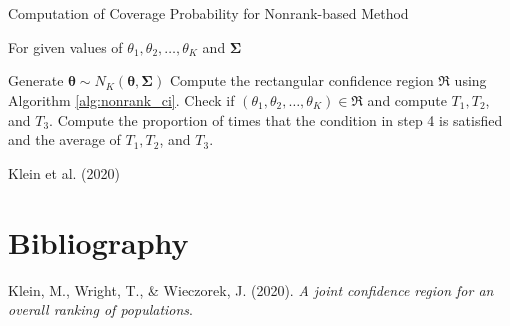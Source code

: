 \documentclass[
  12pt,
  a4paper,
]{article}
\newlength{\cslhangindent}
\newenvironment{CSLReferences}[2] %
 {\begin{list}{}{%
  \setlength{\itemindent}{0pt}
  \setlength{\leftmargin}{0pt}
  \setlength{\parsep}{0pt}
  \ifodd #1
   \setlength{\leftmargin}{\cslhangindent}
   \setlength{\itemindent}{-1\cslhangindent}
  \fi
  \setlength{\itemsep}{#2\baselineskip}}}
 {\end{list}}
\numberwithin{equation}{section}
\begin{document}
\begin{algorithm}[H]
    \caption{Computation of Coverage Probability for Nonrank-based Method} 
    \label{alg:nonrank_cov}
    For given values of $\theta_1, \theta_2, \dots, \theta_K$ and $\boldsymbol{\Sigma}$
    \begin{algorithmic}[1] %
            \State Generate $\boldsymbol{\hat\theta} \sim N_K(\boldsymbol{\theta}, \boldsymbol{\Sigma})$
            \State Compute the rectangular confidence region $\mathfrak{R}$ using Algorithm \ref{alg:nonrank_ci}.
            \State Check if $\left( \theta_1, \theta_2, \dots, \theta_K\right) \in \mathfrak{R}$ and compute $T_1, T_2$, and $T_3$.
        \EndFor
    \State Compute the proportion of times that the condition in step 4 is satisfied and the average of $T_1, T_2$, and $T_3$.
    \end{algorithmic} %
\end{algorithm}

Klein et al. (2020)

\section*{Bibliography}\label{bibliography}

\label{refs}
\begin{CSLReferences}{1}{0}
Klein, M., Wright, T., \& Wieczorek, J. (2020). \emph{A joint confidence region for an overall ranking of populations}.

\end{CSLReferences}
\end{document}

